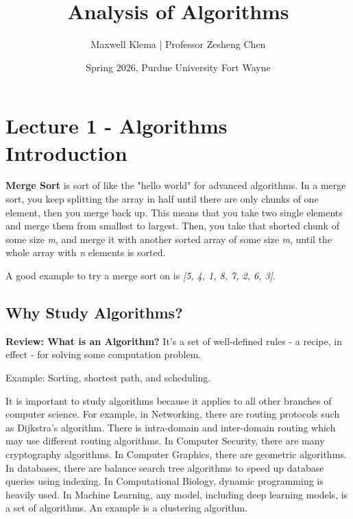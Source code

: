 \documentclass[11pt]{article}
\title{Analysis of Algorithms}
\date{Spring 2026, Purdue University Fort Wayne}
\author{Maxwell Klema | Professor Zesheng Chen}
\begin{document}
\maketitle
\pagestyle{fancy}





\section{Lecture 1 - Algorithms Introduction}
\vspace{11pt}
\textbf{Merge Sort} is sort of like the "hello world" for advanced algorithms. In a merge sort, you keep splitting the array in half until there are only chunks of one element, then you merge back up. This means that you take two single elements and merge them from smallest to largest. Then, you take that shorted chunk of some size \textit{m}, and merge it with another sorted array of some size \textit{m}, until the whole array with \textit{n} elements is sorted.

A good example to try a merge sort on is \textit{[5, 4, 1, 8, 7, 2, 6, 3]}.

\vspace{11pt}
\subsection{Why Study Algorithms?}
\vspace{11pt}

\textbf{Review: What is an Algorithm?} It's a set of well-defined rules - a recipe, in effect - for solving some computation problem.

Example: Sorting, shortest path, and scheduling.

It is important to study algorithms because it applies to all other branches of computer science. For example, in Networking, there are routing protocols such as Dijkstra's algorithm. There is intra-domain and inter-domain routing which may use different routing algorithms. In Computer Security, there are many cryptography algorithms. In Computer Graphics, there are geometric algorithms. In databases, there are balance search tree algorithms to speed up database queries using indexing. In Computational Biology, dynamic programming is heavily used. In Machine Learning, any model, including deep learning models, is a set of algorithms. An example is a clustering algorithm.
\end{document}
